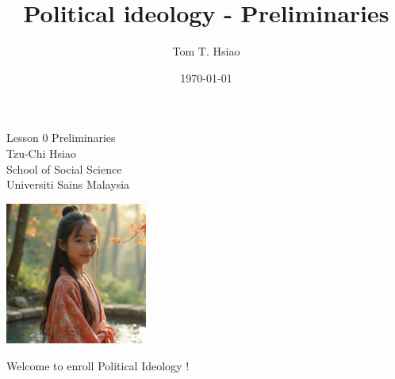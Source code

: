 \documentclass{beamer}
\title{Political ideology - Preliminaries}
\author{Tom T. Hsiao}
\date{\today}
\begin{document}
\begin{frame}
\begin{center}
\Large{Lesson 0 Preliminaries} \\
\vspace{3em}
\normalsize{Tzu-Chi Hsiao} \\
\vspace{3em}
\small{School of Social Science} \\
\vspace{1em}
\small{Universiti Sains Malaysia} \\
\end{center}
\end{frame}
\begin{frame}{}
\begin{center}
\includegraphics[width=0.35\textwidth]{instructor.png}
\end{center}
\vspace{1em}
\begin{center}
\large{Welcome to enroll Political Ideology !}
\end{center}
\end{frame}
\end{document}
